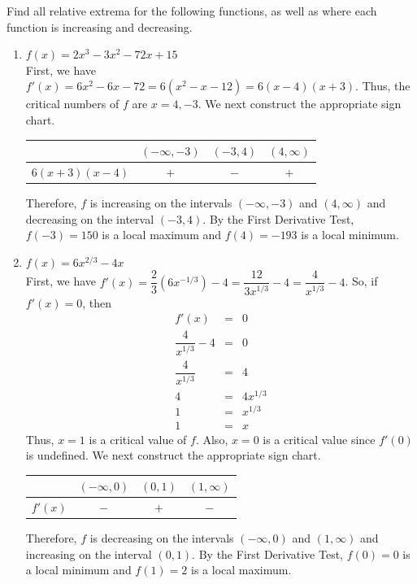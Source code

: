 \documentclass{book}
\begin{document}
\begin{Exam} Find all relative extrema for the following functions, as well as where each function is increasing and decreasing.\\
\begin{enumerate}
\item $f(x) = 2x^3-3x^2-72x+15$\\

First, we have $f'(x) = 6x^2-6x-72 = 6(x^2-x - 12) = 6(x-4)(x+3)$. Thus, the critical numbers of $f$ are $x= 4, -3$. We next construct the appropriate sign chart.\\

\begin{center}
\begin{tabular}{c|c|c|c}
 & $(-\infty, -3)$ & $(-3,4)$ & $(4, \infty)$ \\ \hline
$6(x+3)(x-4)$ & $+$ & $-$ & $+$ \\ %
\end{tabular}
\end{center}\vspace{0.1 in} Therefore, $f$ is increasing on the intervals $(-\infty, -3)$ and $(4,\infty)$ and decreasing on the interval $(-3,4)$. By the First Derivative Test, $f(-3) = 150$ is a local maximum and $f(4) = -193$ is a local minimum.\\

\item $f(x) = 6x^{2/3}-4x$\\

First, we have $f'(x) =\dfrac{2}{3}\left(6x^{-1/3}\right) - 4 = \dfrac{12}{3x^{1/3}}- 4 = \dfrac{4}{x^{1/3}}-4$. So, if $f'(x) = 0$, then 
\begin{eqnarray*}
f'(x) &=& 0\\
\dfrac{4}{x^{1/3}}-4 &=& 0 \\
\dfrac{4}{x^{1/3}} &=& 4\\
4 &=& 4x^{1/3}\\
1 &=& x^{1/3}\\
1 &=& x
\end{eqnarray*} Thus, $x =1$ is a critical value of $f$. Also, $x = 0$ is a critical value since $f'(0)$ is undefined. We next construct the appropriate sign chart.\\

\begin{center}
\begin{tabular}{c|c|c|c}
 & $(-\infty, 0)$ & $(0,1)$ & $(1, \infty)$ \\ \hline
$f'(x)$ & $-$ & $+$ & $-$ \\ %
\end{tabular}
\end{center}\vspace{0.1 in} Therefore, $f$ is decreasing on the intervals $(-\infty, 0)$ and $(1,\infty)$ and increasing on the interval $(0,1)$. By the First Derivative Test, $f(0) = 0$ is a local minimum and $f(1) = 2$ is a local maximum.\\


\end{enumerate}
\end{Exam}
\end{document}
